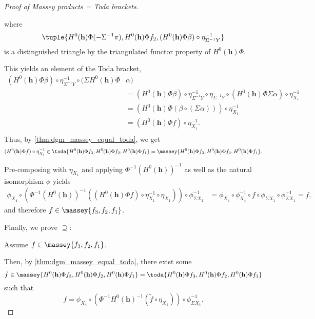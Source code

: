 \begin{proof}[Proof of Massey products = Toda brackets]
\begin{center}
    \end{center}
    where
    \[
        \tuple{H^0(\mathbf{h}) \Phi (-\Sigma^{-1} \pi), H^0(\mathbf{h}) \Phi f_2, (H^0(\mathbf{h}) \Phi \beta) \circ \eta^{-1}_{\Sigma^{-1} Y}}
    \]
    is a distinguished triangle by the triangulated functor property of \( H^0(\mathbf{h}) \Phi \).

    This yields an element of the Toda bracket,
    \begin{align*}
        (H^0(\mathbf{h}) \Phi \beta) \circ \eta^{-1}_{\Sigma^{-1} Y} \circ (\Sigma H^0(\mathbf{h}) \Phi &\alpha) \\
        &= (H^0(\mathbf{h}) \Phi \beta) \circ \eta^{-1}_{\Sigma^{-1} Y} \circ \eta_{\Sigma^{-1} Y} \circ (H^0(\mathbf{h}) \Phi \Sigma \alpha) \circ \eta^{-1}_{X_1} \\
        &= (H^0(\mathbf{h}) \Phi (\beta \circ (\Sigma \alpha))) \circ \eta^{-1}_{X_1} \\
        &= (H^0(\mathbf{h}) \Phi f ) \circ \eta^{-1}_{X_1}. \\
    \end{align*}
    Thus, by \autoref{thm:dgm_massey_equal_toda}, we get
    \[
        (H^0(\mathbf{h}) \Phi f ) \circ \eta^{-1}_{X_1} \in \toda{H^0(\mathbf{h}) \Phi f_3, H^0(\mathbf{h}) \Phi f_2, H^0(\mathbf{h}) \Phi f_1} = \massey{H^0(\mathbf{h}) \Phi f_3, H^0(\mathbf{h}) \Phi f_2, H^0(\mathbf{h}) \Phi f_1}.
    \]

    Pre-composing with \( \eta_{X_1} \) and applying \( \Phi^{-1} (H^0(\mathbf{h}))^{-1} \) as well as the natural isomorphism \( \phi \) yields
    \begin{align*}
        \phi_{X_4} \circ (\Phi^{-1} (H^0(\mathbf{h}))^{-1} ((H^0(\mathbf{h}) \Phi f ) \circ \eta^{-1}_{X_1} \circ \eta_{X_1})) \circ \phi^{-1}_{\Sigma X_1} &= \phi_{X_4} \circ \phi^{-1}_{X_4} \circ f \circ \phi_{\Sigma X_1} \circ \phi^{-1}_{\Sigma X_1} = f,
    \end{align*}
    and therefore \( f \in \massey{f_3, f_2, f_1} \).

    Finally, we prove \( \supseteq \):

    Assume \( f \in \massey{f_3, f_2, f_1} \).

    Then, by \autoref{thm:dgm_massey_equal_toda}, there exist some
    \[
        \tilde{f} \in \massey{H^0(\mathbf{h}) \Phi f_3, H^0(\mathbf{h}) \Phi f_2, H^0(\mathbf{h}) \Phi f_1} = \toda{H^0(\mathbf{h}) \Phi f_3, H^0(\mathbf{h}) \Phi f_2, H^0(\mathbf{h}) \Phi f_1}
    \]
    such that
    \[
        f = \phi_{X_4} \circ (\Phi^{-1} H^0(\mathbf{h})^{-1} (\tilde{f} \circ \eta_{X_1})) \circ \phi^{-1}_{\Sigma X_1}.
    \]


\end{proof}
